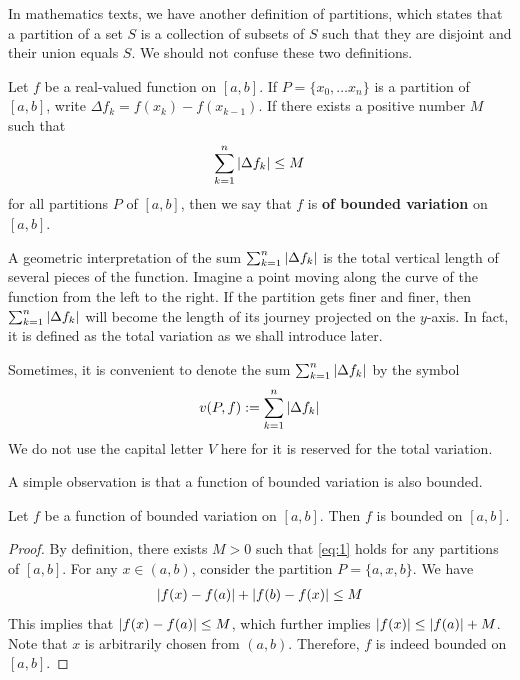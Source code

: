 \documentclass[thmcnt=section, color=blue, 12pt]{my-elegantbook}
\begin{document}
\begin{note}
	In mathematics texts, we have another definition of partitions,
	which states that a partition of a set $S$ is a collection of subsets of $S$
	such that they are disjoint and their union equals $S$.
	We should not confuse these two definitions.
\end{note}

\begin{definition}
	Let $f$ be a real-valued function on $[a, b]$.
	If $P = \{x_0, \dots x_n\}$ is a partition of $[a, b]$,
	write $\Delta f_k = f(x_k) - f(x_{k-1})$.
	If there exists a positive number $M$ such that
	\begin{align}
		\sum_{k=1}^n \left\lvert \Delta f_k \right\rvert \leq M \label{eq:1}
	\end{align}
	for all partitions $P$ of $[a, b]$, then we say that $f$
	is \textbf{of bounded variation}
	on $[a, b]$.
\end{definition}

\begin{note}
	A geometric interpretation of the sum $\sum_{k=1}^n \left\lvert \Delta f_k \right\rvert$
	is the total vertical length of several pieces of the function.
	Imagine a point moving along the curve of the function from the
	left to the right.
	If the partition gets finer and finer,
	then $\sum_{k=1}^n \left\lvert \Delta f_k \right\rvert$
	will become the length of its journey projected on the $y$-axis.
	In fact, it is defined as the total variation as we shall introduce later.
\end{note}

Sometimes, it is convenient to denote the sum $\sum_{k=1}^n \left\lvert \Delta f_k \right\rvert$
by the symbol
\begin{align*}
	v(P, f) := \sum_{k=1}^n \left\lvert \Delta f_k \right\rvert
\end{align*}
We do not use the capital letter $V$ here for it is reserved for
the total variation.

A simple observation is that a function of bounded variation is also bounded.

\begin{proposition} \label{prop:2}
	Let $f$ be a function of bounded variation on $[a, b]$.
	Then $f$ is bounded on $[a, b]$.
\end{proposition}

\begin{proof}
	By definition, there exists $M > 0$ such that \eqref{eq:1} holds
	for any partitions of $[a, b]$.
	For any $x \in (a, b)$, consider the partition $P = \{a, x, b\}$.
	We have
	\begin{align*}
		\left\lvert f(x) - f(a) \right\rvert + \left\lvert f(b) - f(x) \right\rvert \leq M
	\end{align*}
	This implies that $\left\lvert f(x) - f(a) \right\rvert \leq M$, which further
	implies $\left\lvert f(x) \right\rvert \leq \left\lvert f(a) \right\rvert + M$.
	Note that $x$ is arbitrarily chosen from $(a, b)$.
	Therefore, $f$ is indeed bounded on $[a, b]$.
\end{proof}
\end{document}
